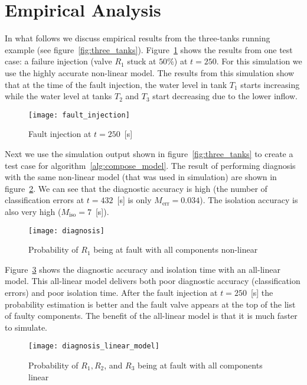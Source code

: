 \section{Empirical Analysis}
%
In what follows we discuss empirical results from the three-tanks
running example (see
figure~\ref{fig:three_tanks}). Figure~\ref{fig:fault_injection} shows
the results from one test case: a failure injection (valve $R_1$ stuck
at $50$\%) at $t = 250$. For this simulation we use the highly
accurate non-linear model. The results from this simulation show that
at the time of the fault injection, the water level in tank $T_1$
starts increasing while the water level at tanks $T_2$ and $T_3$ start
decreasing due to the lower inflow.
%
\begin{figure}[htb]
  \centering
  \texttt{[image: fault\_injection]}
  \caption{Fault injection at $t = 250$~[s]}
  \label{fig:fault_injection}
\end{figure}
\par
%
Next we use the simulation output shown in figure~\ref{fig:three_tanks} to
create a test case for algorithm~\ref{alg:compose_model}. The result
of performing diagnosis with the same non-linear model (that was used in
simulation) are shown in figure~\ref{fig:diagnosis1}. We can see that
the diagnostic accuracy is high (the number of classification errors
at $t = 432$~[s] is only $M_{\mathrm{err}} = 0.034$). The isolation
accuracy is also very high ($M_{\mathrm{iso}} = 7$~[s]).
%
\begin{figure}[htb]
  \centering
  \texttt{[image: diagnosis]}
  \caption{Probability of $R_1$ being at fault with all components non-linear}
  \label{fig:diagnosis1}
\end{figure}
\par
%
Figure~\ref{fig:diagnosis_linear_model} shows the diagnostic accuracy
and isolation time with an all-linear model. This all-linear model
delivers both poor diagnostic accuracy (classification errors) and poor
isolation time. After the fault injection at $t = 250$~[s] the
probability estimation is better and the fault valve appears
at the top of the list of faulty components. The benefit of the
all-linear model is that it is much faster to simulate.
%
\begin{figure}[htb]
  \centering
  \texttt{[image: diagnosis\_linear\_model]}
  \caption{Probability of $R_1, R_2$, and $R_3$ being at fault with all components linear}
  \label{fig:diagnosis_linear_model}
\end{figure}
\par
